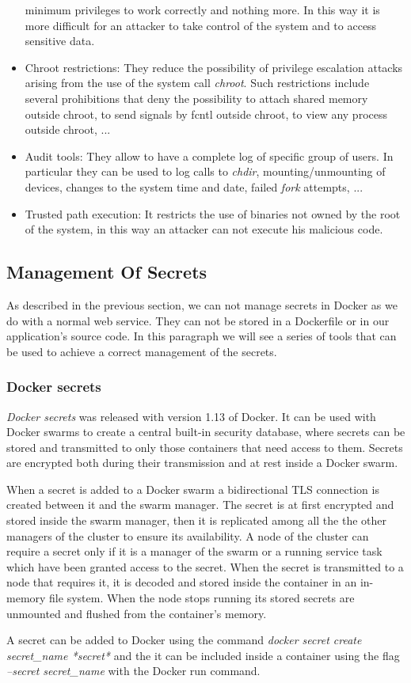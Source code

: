 \documentclass[a4paper,12pt]{article}
\begin{document}
\begin{itemize}
  minimum privileges to work correctly and nothing more. In this way it is more
  difficult for an attacker to take control of the system and to access
  sensitive data.
  \item Chroot restrictions: They reduce the possibility of privilege escalation
  attacks arising from the use of the system call \textit{chroot}. Such
  restrictions include several prohibitions that deny the possibility to
  attach shared memory outside chroot, to send signals by fcntl outside chroot,
  to view any process outside chroot, ...
  \item Audit tools: They allow to have a complete log of specific group of
  users. In particular they can be used to log calls to \textit{chdir},
  mounting/unmounting of devices, changes to the system time and date, failed
  \textit{fork} attempts, ...
  \item Trusted path execution: It restricts the use of binaries not owned by
  the root of the system, in this way an attacker can not execute his malicious
  code.
\end{itemize}

\subsection{Management Of Secrets}

As described in the previous section, we can not manage secrets in Docker as we
do with a normal web service. They can not be stored in a Dockerfile or in our
application's source code. In this paragraph we will see a series of tools that
can be used to achieve a correct management of the secrets. 

\subsubsection{Docker secrets}

\textit{Docker secrets} \cite{docker_secrets} was released with version 1.13 of
Docker. It can be used with Docker swarms to create a central built-in security
database, where secrets can be stored and transmitted to only those containers
that need access to them. Secrets are encrypted both during their transmission
and at rest inside a Docker swarm. \par When a secret is added to a Docker swarm
a bidirectional TLS connection is created between it and the swarm manager. The
secret is at first encrypted and stored inside the swarm manager, then it is
replicated among all the the other managers of the cluster to ensure its
availability. A node of the cluster can require a secret only if it is a manager
of the swarm or a running service task which have been granted access to the
secret. When the secret is transmitted to a node that requires it, it is
decoded and stored inside the container in an in-memory file system. When the
node stops running its stored secrets are unmounted and flushed from the
container's memory.\par A secret can be added to Docker using the command
\textit{docker secret create secret\_name *secret*} and the it can be included
inside a container using the flag \textit{--secret secret\_name} with the Docker
run command.
\end{document}

